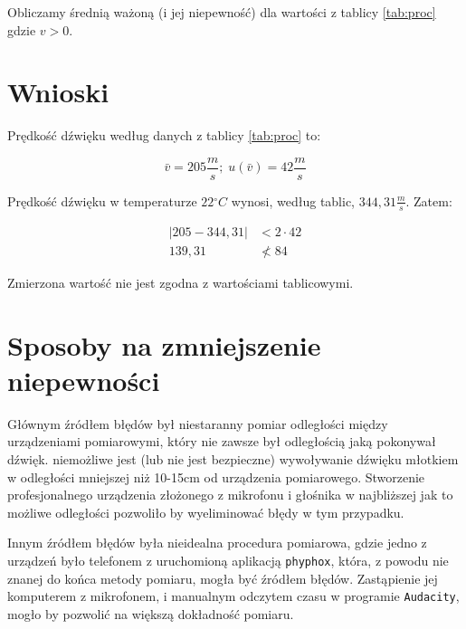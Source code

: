 \documentclass[a4paper,12pt]{article}
\newcommand{\stopnie}{\ensuremath{^{\circ}}}
\begin{document}
Obliczamy średnią ważoną (i jej niepewność) dla wartości z tablicy \ref{tab:proc} gdzie $v > 0$.
\clearpage

\section{Wnioski}

Prędkość dźwięku według danych z tablicy \ref{tab:proc} to:

\[\bar{v} = 205 \frac{m}{s};\; u\left(\bar{v}\right) = 42 \frac{m}{s}\]

Prędkość dźwięku w temperaturze $22\stopnie C$ wynosi, według tablic, $344,31 \frac{m}{s}$. Zatem:

\begin{align*}
    \left| 205 - 344,31 \right| &< 2 \cdot 42\\
    139,31 &\not < 84
\end{align*}

Zmierzona wartość nie jest zgodna z wartościami tablicowymi.

\section{Sposoby na zmniejszenie niepewności}

Głównym źródłem błędów był niestaranny pomiar odległości między urządzeniami pomiarowymi, który nie zawsze był odległością jaką pokonywał dźwięk. niemożliwe jest (lub nie jest bezpieczne) wywoływanie dźwięku młotkiem w odległości mniejszej niż 10-15cm od urządzenia pomiarowego. Stworzenie profesjonalnego urządzenia złożonego z mikrofonu i głośnika w najbliższej jak to możliwe odległości pozwoliło by wyeliminować błędy w tym przypadku.

Innym źródłem błędów była nieidealna procedura pomiarowa, gdzie jedno z urządzeń było telefonem z uruchomioną aplikacją \texttt{phyphox}, która, z powodu nie znanej do końca metody pomiaru, mogła być źródłem błędów. Zastąpienie jej komputerem z mikrofonem, i manualnym odczytem czasu w programie \texttt{Audacity}, mogło by pozwolić na większą dokładność pomiaru.
\end{document}

